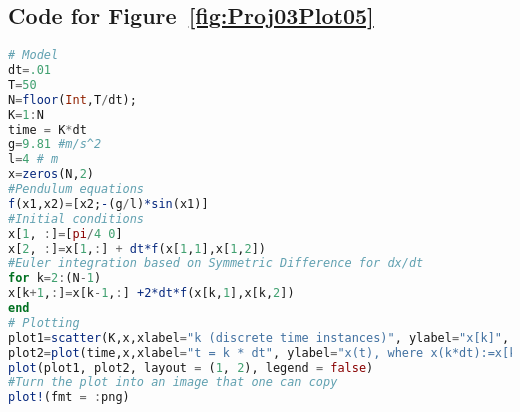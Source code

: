 \subsection{Code for Figure~\ref{fig:Proj03Plot05}}
\label{sec:CodeFigs05}

\begin{lstlisting}[language=Julia]
# Model 
dt=.01
T=50
N=floor(Int,T/dt);
K=1:N
time = K*dt
g=9.81 #m/s^2
l=4 # m
x=zeros(N,2)
#Pendulum equations
f(x1,x2)=[x2;-(g/l)*sin(x1)]
#Initial conditions
x[1, :]=[pi/4 0]
x[2, :]=x[1,:] + dt*f(x[1,1],x[1,2])
#Euler integration based on Symmetric Difference for dx/dt
for k=2:(N-1)
x[k+1,:]=x[k-1,:] +2*dt*f(x[k,1],x[k,2])
end
# Plotting 
plot1=scatter(K,x,xlabel="k (discrete time instances)", ylabel="x[k]", leg=false)
plot2=plot(time,x,xlabel="t = k * dt", ylabel="x(t), where x(k*dt):=x[k]", leg=false)
plot(plot1, plot2, layout = (1, 2), legend = false)
#Turn the plot into an image that one can copy
plot!(fmt = :png) 
\end{lstlisting}



